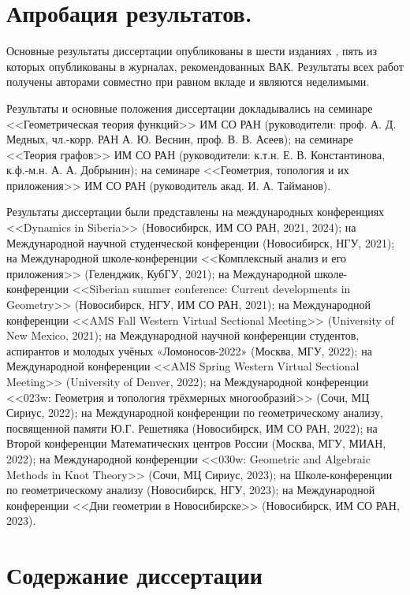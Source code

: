 \section{Апробация результатов.}

Основные результаты диссертации опубликованы в шести изданиях \cite{DST2021, DST2022, DT2024fqd, TD2022fs, TD2023fs, VDT2020}, пять из которых \cite{DST2021, DST2022, DT2024fqd, TD2023fs, VDT2020} опубликованы в журналах, рекомендованных ВАК.
Результаты всех работ получены авторами совместно при равном вкладе и являются неделимыми.

Результаты и основные положения диссертации докладывались на семинаре <<Геометрическая теория функций>> ИМ СО РАН (руководители:
проф. А. Д. Медных, чл.-корр. РАН А. Ю. Веснин, проф. В. В. Асеев); на семинаре <<Теория графов>> ИМ СО РАН (руководители: к.т.н. Е. В. Константинова, к.ф.-м.н. А. А. Добрынин); на семинаре <<Геометрия, топология и их приложения>> ИМ СО РАН (руководитель акад. И. А. Тайманов).

Результаты диссертации были представлены на международных конференциях <<Dynamics in Siberia>> (Новосибирск, ИМ СО РАН, 2021, 2024); 
на Международной научной студенческой конференции (Новосибирск, НГУ, 2021);
на Международной школе-конференции <<Комплексный анализ и его приложения>> (Геленджик, КубГУ, 2021); 
на Международной школе-конференции <<Siberian summer conference: Current developments in Geometry>> (Новосибирск, НГУ, ИМ СО РАН, 2021); 
на Международной конференции <<AMS Fall Western Virtual Sectional Meeting>> (University of New Mexico, 2021); 
на Международной научной конференции студентов, аспирантов и молодых учёных «Ломоносов-2022» (Москва, МГУ, 2022); 
на Международной конференции <<AMS Spring Western Virtual Sectional Meeting>> (University of Denver, 2022); 
на Международной конференции <<023w: Геометрия и топология трёхмерных многообразий>> (Сочи, МЦ Сириус, 2022); 
на Международной конференции по геометрическому анализу, посвященной памяти Ю.Г. Решетняка (Новосибирск, ИМ СО РАН, 2022); 
на Второй конференции Математических центров России (Москва, МГУ, МИАН, 2022); 
на Международной конференции <<030w: Geometric and Algebraic Methods in Knot Theory>> (Сочи, МЦ Сириус, 2023);
на Школе-конференции по геометрическому анализу
(Новосибирск, НГУ, 2023);
на Международной конференции <<Дни геометрии в Новосибирске>> (Новосибирск, ИМ СО РАН, 2023).


\section{Содержание диссертации}

